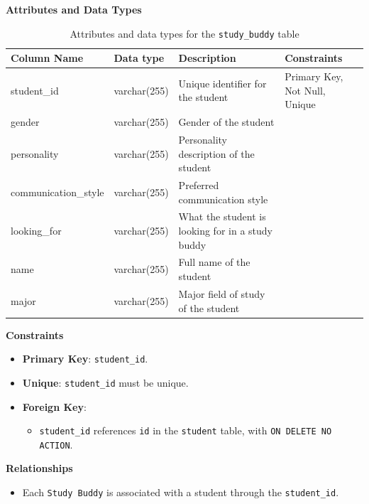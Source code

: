 \documentclass[12pt]{article}
\begin{document}
\textbf{Attributes and Data Types}
\begin{table}[H] 
    \centering 
    \renewcommand{\arraystretch}{1.5} 
    \begin{tabular}{|l|l|p{2.1cm}|l|} 
    \hline 
    \rowcolor[HTML]{96FFFB} 
    \textbf{Column Name} & \textbf{Data type} & \textbf{Description} & \textbf{Constraints} \\ \hline 
    student\_id & varchar(255) & Unique identifier for the student & Primary Key, Not Null, Unique \\ \hline 
    gender & varchar(255) & Gender of the student & \\ \hline 
    personality & varchar(255) & Personality description of the student & \\ \hline 
    communication\_style & varchar(255) & Preferred communication style & \\ \hline 
    looking\_for & varchar(255) & What the student is looking for in a study buddy & \\ \hline 
    name & varchar(255) & Full name of the student & \\ \hline 
    major & varchar(255) & Major field of study of the student & \\ \hline 
    \end{tabular} 
    \caption{Attributes and data types for the \texttt{study\_buddy} table} 
\end{table}

\noindent 
\textbf{Constraints} 
\begin{itemize} 
    \item \textbf{Primary Key}: \texttt{student\_id}. 
    \item \textbf{Unique}: \texttt{student\_id} must be unique. 
    \item \textbf{Foreign Key}: \begin{itemize} 
        \item \texttt{student\_id} references \texttt{id} in the \texttt{student} table, with \texttt{ON DELETE NO ACTION}. 
    \end{itemize} 
\end{itemize}

\noindent 
\textbf{Relationships} 
\begin{itemize} 
    \item Each \texttt{Study Buddy} is associated with a student through the \texttt{student\_id}. 
\end{itemize}

\pagebreak
\end{document}
